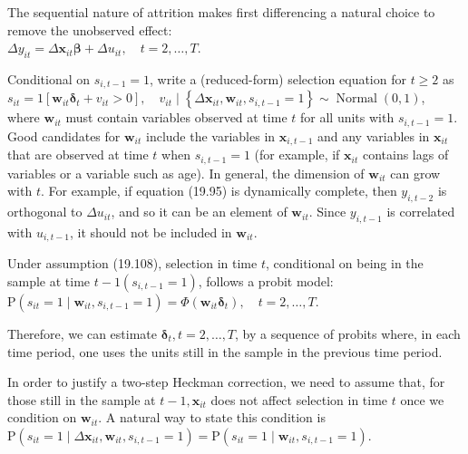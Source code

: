 \documentclass[10pt]{article}
\begin{document}
The sequential nature of attrition makes first differencing a natural choice to remove the unobserved effect:\\
$\Delta y_{i t}=\Delta \mathbf{x}_{i t} \boldsymbol{\beta}+\Delta u_{i t}, \quad t=2, \ldots, T$.

Conditional on $s_{i, t-1}=1$, write a (reduced-form) selection equation for $t \geq 2$ as\\
$s_{i t}=1\left[\mathbf{w}_{i t} \boldsymbol{\delta}_{t}+v_{i t}>0\right], \quad v_{i t} \mid\left\{\Delta \mathbf{x}_{i t}, \mathbf{w}_{i t}, s_{i, t-1}=1\right\} \sim \operatorname{Normal}(0,1)$,\\
where $\mathbf{w}_{i t}$ must contain variables observed at time $t$ for all units with $s_{i, t-1}=1$. Good candidates for $\mathbf{w}_{i t}$ include the variables in $\mathbf{x}_{i, t-1}$ and any variables in $\mathbf{x}_{i t}$ that are observed at time $t$ when $s_{i, t-1}=1$ (for example, if $\mathbf{x}_{i t}$ contains lags of variables or a variable such as age). In general, the dimension of $\mathbf{w}_{i t}$ can grow with $t$. For example, if equation (19.95) is dynamically complete, then $y_{i, t-2}$ is orthogonal to $\Delta u_{i t}$, and so it can be an element of $\mathbf{w}_{i t}$. Since $y_{i, t-1}$ is correlated with $u_{i, t-1}$, it should not be included in $\mathbf{w}_{i t}$.

Under assumption (19.108), selection in time $t$, conditional on being in the sample at time $t-1\left(s_{i, t-1}=1\right)$, follows a probit model:\\
$\mathrm{P}\left(s_{i t}=1 \mid \mathbf{w}_{i t}, s_{i, t-1}=1\right)=\Phi\left(\mathbf{w}_{i t} \boldsymbol{\delta}_{t}\right), \quad t=2, \ldots, T$.

Therefore, we can estimate $\boldsymbol{\delta}_{t}, t=2, \ldots, T$, by a sequence of probits where, in each time period, one uses the units still in the sample in the previous time period.

In order to justify a two-step Heckman correction, we need to assume that, for those still in the sample at $t-1, \mathbf{x}_{i t}$ does not affect selection in time $t$ once we condition on $\mathbf{w}_{i t}$. A natural way to state this condition is\\
$\mathrm{P}\left(s_{i t}=1 \mid \Delta \mathbf{x}_{i t}, \mathbf{w}_{i t}, s_{i, t-1}=1\right)=\mathrm{P}\left(s_{i t}=1 \mid \mathbf{w}_{i t}, s_{i, t-1}=1\right)$.
\end{document}
